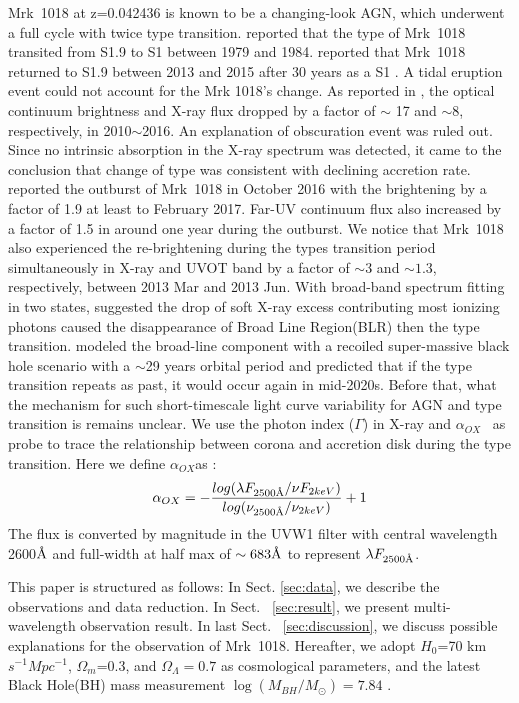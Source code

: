 \documentclass{aastex63}
\newcommand{\alphaox}{$\alpha_{OX}$}
\newcommand{\angstrom}{\text{\normalfont\AA}}
\begin{document}
Mrk~1018 at z=0.042436 is known to be a changing-look AGN, which underwent a full cycle with twice type transition. \citet{1986ApJ...311..135C} reported that the type of Mrk~1018 transited from S1.9 to S1 between 1979 and 1984. \citet{2016A&A...593L...8M} reported that Mrk~1018 returned to S1.9 between 2013 and 2015 after 30 years as a S1 \citep[see also][]{2017A&A...607L...9K}. A tidal eruption event could not account for the Mrk 1018's change. As reported in \citet{2016A&A...593L...9H}, the optical continuum brightness and X-ray flux dropped by a factor of $\sim$ 17 and $\sim 8$, respectively, in 2010$\sim$2016. An explanation of obscuration event was ruled out. Since no intrinsic absorption in the X-ray spectrum was detected, it came to the conclusion that change of type was consistent with declining accretion rate. \citet{2017A&A...607L...9K} reported the outburst of Mrk~1018 in October 2016 with the brightening by a factor of 1.9 at least to February 2017. Far-UV continuum flux also increased by a factor of 1.5 in around one year during the outburst. We notice that Mrk~1018 also experienced the re-brightening during the types transition period simultaneously in X-ray and UVOT band by a factor of $\sim3$ and $\sim1.3$, respectively, between 2013 Mar and 2013 Jun. With broad-band spectrum fitting in two states, \citet{2018MNRAS.480.3898N} suggested the drop of soft X-ray excess contributing most ionizing photons caused the disappearance of Broad Line Region(BLR) then the type transition. \citet{2018ApJ...861...51K} modeled the broad-line component with a recoiled super-massive black hole scenario with a $\sim$29 years orbital period and predicted that if the type transition repeats as past, it would occur again in mid-2020s. Before that, what the mechanism for such short-timescale light curve variability for AGN and type transition is remains unclear. We use the photon index ($\Gamma$) in X-ray and \alphaox ~ as probe to trace the relationship between corona and accretion disk during the type transition. Here we define \alphaox as :
\begin{equation}
\alpha_{OX}  = - \frac{log(\lambda F_{2500 \angstrom}/\nu F_{2keV})}{log(\nu_{ 2500 \angstrom }/\nu_{2keV})}+1
\end{equation}
The flux is converted by magnitude in the UVW1 filter with central wavelength {2600{$\angstrom$}} and full-width at half max of $\sim 683\angstrom$ \citep{2008MNRAS.383..627P} to represent $\lambda F_{2500 \angstrom}$.  

This paper is structured as follows: In Sect. \ref{sec:data}, we describe the observations and data reduction. In Sect. ~\ref{sec:result}, we present multi-wavelength observation result. In last Sect. ~\ref{sec:discussion}, we discuss possible explanations for the observation of Mrk~1018. Hereafter, we adopt $H_0$=70 km $s^{-1} Mpc^{-1}$, $\Omega_{m}$=0.3, and $\Omega_{\Lambda}=0.7 $ as cosmological parameters, and the latest Black Hole(BH) mass measurement $\log(M_{BH}/M_{\odot})=7.84$ \citep{2017MNRAS.472.3492E,2018MNRAS.480.3898N}. 
\end{document}
